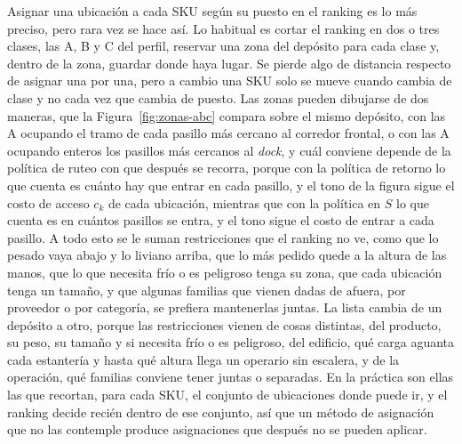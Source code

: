 Asignar una ubicación a cada SKU según su puesto en el ranking es lo más preciso, pero rara vez se hace así.
Lo habitual es cortar el ranking en dos o tres clases, las A, B y C del perfil, reservar una zona del depósito para cada clase y, dentro de la zona, guardar donde haya lugar.
Se pierde algo de distancia respecto de asignar una por una, pero a cambio una SKU solo se mueve cuando cambia de clase y no cada vez que cambia de puesto.
Las zonas pueden dibujarse de dos maneras, que la Figura~\ref{fig:zonas-abc} compara sobre el mismo depósito, con las A ocupando el tramo de cada pasillo más cercano al corredor frontal, o con las A ocupando enteros los pasillos más cercanos al \emph{dock}, y cuál conviene depende de la política de ruteo con que después se recorra, porque con la política de retorno lo que cuenta es cuánto hay que entrar en cada pasillo, y el tono de la figura sigue el costo de acceso $c_k$ de cada ubicación, mientras que con la política en $S$ lo que cuenta es en cuántos pasillos se entra, y el tono sigue el costo de entrar a cada pasillo.
A todo esto se le suman restricciones que el ranking no ve, como que lo pesado vaya abajo y lo liviano arriba, que lo más pedido quede a la altura de las manos, que lo que necesita frío o es peligroso tenga su zona, que cada ubicación tenga un tamaño, y que algunas familias que vienen dadas de afuera, por proveedor o por categoría, se prefiera mantenerlas juntas.
La lista cambia de un depósito a otro, porque las restricciones vienen de cosas distintas, del producto, su peso, su tamaño y si necesita frío o es peligroso, del edificio, qué carga aguanta cada estantería y hasta qué altura llega un operario sin escalera, y de la operación, qué familias conviene tener juntas o separadas.
En la práctica son ellas las que recortan, para cada SKU, el conjunto de ubicaciones donde puede ir, y el ranking decide recién dentro de ese conjunto, así que un método de asignación que no las contemple produce asignaciones que después no se pueden aplicar.

